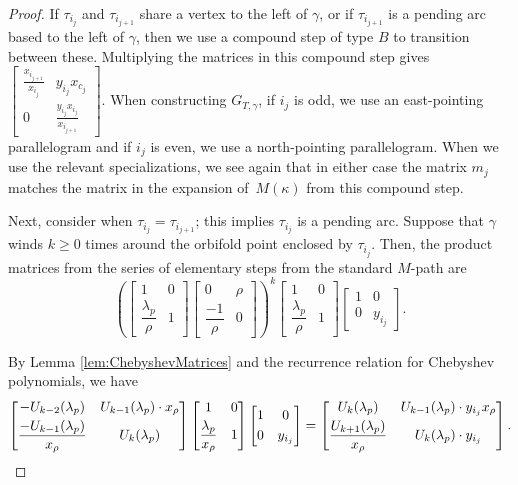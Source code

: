 \documentclass[11pt]{article}
\numberwithin{equation}{section}
\begin{document}
\begin{proof}
If $\tau_{i_j}$ and $\tau_{i_{j+1}}$ share a vertex to the left of $\gamma$, or if $\tau_{i_{j+1}}$ is a pending arc based to the left of $\gamma$, then we use a compound step of type $B$ to transition between these. Multiplying the matrices in this compound step gives $\left[\begin{smallmatrix} \frac{x_{i_{j+1}}}{x_{i_j}} & y_{i_j}x_{c_j} \\ 0 & \frac{y_{i_j}x_{i_j}}{x_{i_{j+1}}} \end{smallmatrix}\right] $. When constructing $G_{T,\gamma}$, if $i_j$ is odd, we use an east-pointing parallelogram and if $i_j$ is even, we use a north-pointing parallelogram. When we use the relevant specializations, we see again that in either case the matrix $m_j$ matches the matrix in the expansion of~$M(\kappa)$ from this compound step.

Next, consider when $\tau_{i_j} = \tau_{i_{j+1}}$; this implies $\tau_{i_j}$ is a pending arc. Suppose that $\gamma$ winds $k \geq 0$ times around the orbifold point enclosed by $\tau_{i_j}$. Then, the product matrices from the series of elementary steps from the standard $M$-path are \[
\left( \begin{bmatrix} 1 & 0 \\ \dfrac{\lambda_p}{\rho} & 1 \end{bmatrix} \begin{bmatrix} 0 & \rho \\ \dfrac{-1}{\rho} & 0 \end{bmatrix} \right)^k \begin{bmatrix} 1 & 0 \\ \dfrac{\lambda_p}{\rho} & 1 \end{bmatrix} \begin{bmatrix} 1 & 0 \\ 0 & y_{i_j} \end{bmatrix}.
\]

By Lemma \ref{lem:ChebyshevMatrices} and the recurrence relation for Chebyshev polynomials, we have \[
\begin{bmatrix} -U_{k-2} (\lambda_p) & U_{k-1}(\lambda_p) \cdot x_\rho \vspace{1mm}\\ \dfrac{-U_{k-1}(\lambda_p)}{x_\rho} & U_k(\lambda_p) \end{bmatrix} \begin{bmatrix} 1 & 0 \vspace{1mm}\\ \dfrac{\lambda_p}{x_\rho} & 1 \end{bmatrix} \begin{bmatrix} 1 & 0 \vspace{1mm}\\ 0 & y_{i_j} \end{bmatrix} = \begin{bmatrix} U_k(\lambda_p) & U_{k-1}(\lambda_p) \cdot y_{i_j} x_\rho \vspace{1mm}\\ \dfrac{U_{k+1}(\lambda_p)}{x_\rho} & U_k(\lambda_p) \cdot y_{i_j} \end{bmatrix}.
\]


\end{proof}
\end{document}
